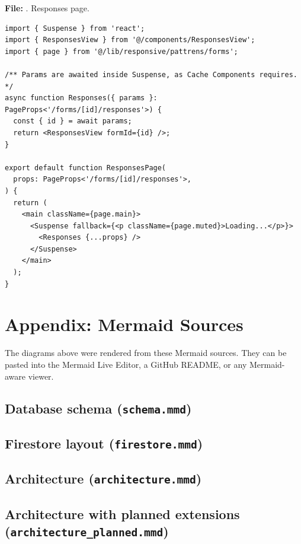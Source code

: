 \documentclass[11pt,a4paper]{article}
\begin{document}
\textbf{File:} . Responses page.\par
\begin{lstlisting}
import { Suspense } from 'react';
import { ResponsesView } from '@/components/ResponsesView';
import { page } from '@/lib/responsive/pattrens/forms';

/** Params are awaited inside Suspense, as Cache Components requires. */
async function Responses({ params }: PageProps<'/forms/[id]/responses'>) {
  const { id } = await params;
  return <ResponsesView formId={id} />;
}

export default function ResponsesPage(
  props: PageProps<'/forms/[id]/responses'>,
) {
  return (
    <main className={page.main}>
      <Suspense fallback={<p className={page.muted}>Loading...</p>}>
        <Responses {...props} />
      </Suspense>
    </main>
  );
}
\end{lstlisting}


\clearpage
\section*{Appendix: Mermaid Sources}
The diagrams above were rendered from these Mermaid sources. They can be pasted into the Mermaid Live Editor, a GitHub README, or any Mermaid-aware viewer.

\subsection*{Database schema (\texttt{schema.mmd})}


\subsection*{Firestore layout (\texttt{firestore.mmd})}


\subsection*{Architecture (\texttt{architecture.mmd})}


\subsection*{Architecture with planned extensions (\texttt{architecture\_planned.mmd})}

\end{document}
